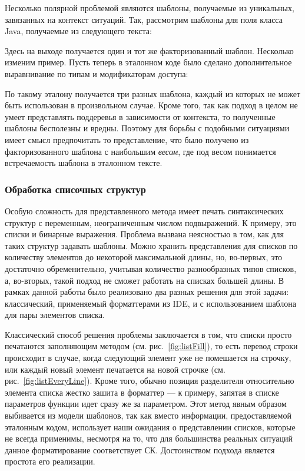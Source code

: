 Несколько полярной проблемой являются шаблоны, получаемые из уникальных,
завязанных на контекст ситуаций. Так, рассмотрим шаблоны для поля класса Java,
получаемые из следующего текста:



Здесь на выходе получается один и тот же факторизованный шаблон.
Несколько изменим пример. Пусть теперь
в эталонном коде было сделано дополнительное выравнивание по типам
и модификаторам доступа:



По такому эталону получается три разных шаблона, каждый из которых не может
быть использован в произвольном случае. Кроме того, так как подход в целом не
умеет представлять поддеревья в зависимости от контекста, то полученные шаблоны
бесполезны и вредны. Поэтому для борьбы с подобными ситуациями имеет смысл
предпочитать то представление, что было получено из факторизованного шаблона с
наибольшим \emph{весом}, где под весом понимается встречаемость шаблона в
эталонном тексте.

\newpage
\subsubsection{Обработка списочных структур}

Особую сложность для представленного метода имеет
печать синтаксических структур с переменным, неограниченным числом
подвыражений. К примеру, это списки и бинарные выражения. Проблема вызвана
неясностью в том, как для таких структур задавать шаблоны. Можно хранить
представления для списков по количеству элементов
до некоторой максимальной длины, но,
во-первых, это достаточно обременительно, учитывая количество разнообразных
типов списков, а, во-вторых, такой подход не сможет работать на списках большей
длины. В рамках данной работы было реализовано два разных решения для этой
задачи: классический, применяемый форматтерами из IDE, и с использованием
шаблона для пары элементов списка.

Классический способ решения проблемы заключается в том, что
списки просто печатаются заполняющим методом (см. рис.~\ref{fig:listFill}),
то есть перевод строки происходит
в случае, когда следующий элемент уже не помешается на строчку, или каждый
новый элемент печатается на новой строчке (см. рис.~\ref{fig:listEveryLine}).
Кроме того, обычно позиция разделителя относительно элемента списка жестко
зашита в форматтер --- к примеру,
запятая в списке параметров функции идет сразу же за параметром.
Этот метод явным образом выбивается из модели шаблонов, так как
вместо информации, предоставляемой эталонным кодом, использует наши
ожидания о представлении списков, которые не всегда применимы,
несмотря на то, что для большинства реальных ситуаций данное форматирование
соответствует СК.
Достоинством подхода является простота его реализации.

